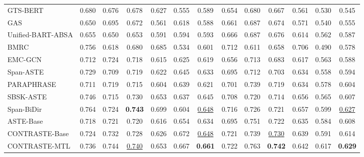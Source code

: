 \begin{table*}
{\begin{tabular}{l|c|c|c|c|c|c|c|c|c|c|c|c}
        GTS-BERT  & 0.680 & 0.676 & 0.678 & 0.627 & 0.555 & 0.589 & 0.654 & 0.680 & 0.667 & 0.561 & 0.530 & 0.545 \\
        
        GAS  & 0.650 & 0.695 & 0.672 & 0.561 & 0.618 & 0.588 & 0.661 & 0.687 & 0.674 & 0.571 & 0.540 & 0.555 
        \\
        
        Unified-BART-ABSA 
        & 0.655 & 0.650 & 0.653 & 0.591 & 0.594 & 0.593 & 0.666 & 0.687 & 0.676 & 0.614 & 0.562 & 0.587
        \\
        
        BMRC  & 0.756 & 0.618 & 0.680 & 0.685 & 0.534 & 0.601 & 0.712 & 0.611 & 0.658 & 0.706 & 0.490 & 0.578 \\
        
        EMC-GCN  & 0.712 & 0.724 & 0.718 & 0.615 & 0.625 & 0.619 & 0.656 & 0.713 & 0.683 & 0.617 & 0.563 & 0.588 \\
        
        Span-ASTE  & 0.729 & 0.709 & 0.719 & 0.622 & 0.645 & 0.633 & 0.695 & 0.712 & 0.703 & 0.634 & 0.558 & 0.594 \\
        
        PARAPHRASE 
        & 0.711 & 0.719 & 0.715 & 0.604 & 0.639 & 0.621 & 0.701 & 0.739 & 0.719 & 0.634 & 0.578 & 0.604 
        \\

        SBSK-ASTE  &  0.746 & 0.715 & 0.730 & 0.653 & 0.637 & 0.645 & 0.708 & 0.720 & 0.714 & 0.656 & 0.565 & 0.607 \\

        Span-BiDir  &  0.764 & 0.724 & \textbf{0.743} & 0.699 & 0.604 & \underline{0.648} & 0.716 & 0.726 & 0.721 & 0.657 & 0.599 & \underline{0.627} \\
        
        \hline
        
        ASTE-Base & 0.718 & 0.721 & 0.720 & 0.616 & 0.654 & 0.634 & 0.695 & 0.751 & 0.722 & 0.635 & 0.584 & 0.608 \\
        
        CONTRASTE-Base & 0.724 & 0.732 & 0.728 & 0.626 & 0.672 & \underline{0.648} & 0.721 & 0.739 & \underline{0.730} & 0.639 & 0.591 & 0.614 \\
        
        CONTRASTE-MTL
        & 0.736 & 0.744 & \underline{0.740} & 0.653 & 0.667 & \textbf{0.661} & 0.722 & 0.763 & \textbf{0.742} & 0.642 & 0.617 & \textbf{0.629} \\
        

\end{tabular}}
\end{table*}
